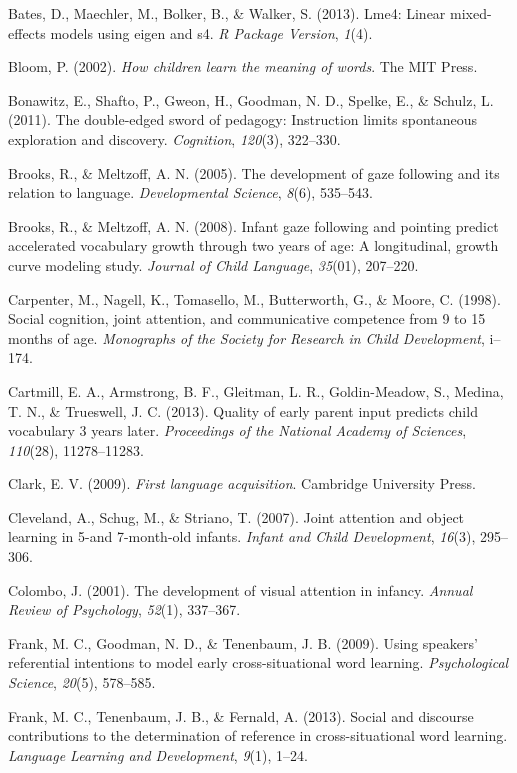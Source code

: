 \documentclass[a4paper,man,natbib]{apa6}
\begin{document}
Bates, D., Maechler, M., Bolker, B., \& Walker, S. (2013). Lme4: Linear
mixed-effects models using eigen and s4. \emph{R Package Version},
\emph{1}(4).

Bloom, P. (2002). \emph{How children learn the meaning of words}. The
MIT Press.

Bonawitz, E., Shafto, P., Gweon, H., Goodman, N. D., Spelke, E., \&
Schulz, L. (2011). The double-edged sword of pedagogy: Instruction
limits spontaneous exploration and discovery. \emph{Cognition},
\emph{120}(3), 322--330.

Brooks, R., \& Meltzoff, A. N. (2005). The development of gaze following
and its relation to language. \emph{Developmental Science}, \emph{8}(6),
535--543.

Brooks, R., \& Meltzoff, A. N. (2008). Infant gaze following and
pointing predict accelerated vocabulary growth through two years of age:
A longitudinal, growth curve modeling study. \emph{Journal of Child
Language}, \emph{35}(01), 207--220.

Carpenter, M., Nagell, K., Tomasello, M., Butterworth, G., \& Moore, C.
(1998). Social cognition, joint attention, and communicative competence
from 9 to 15 months of age. \emph{Monographs of the Society for Research
in Child Development}, i--174.

Cartmill, E. A., Armstrong, B. F., Gleitman, L. R., Goldin-Meadow, S.,
Medina, T. N., \& Trueswell, J. C. (2013). Quality of early parent input
predicts child vocabulary 3 years later. \emph{Proceedings of the
National Academy of Sciences}, \emph{110}(28), 11278--11283.

Clark, E. V. (2009). \emph{First language acquisition}. Cambridge
University Press.

Cleveland, A., Schug, M., \& Striano, T. (2007). Joint attention and
object learning in 5-and 7-month-old infants. \emph{Infant and Child
Development}, \emph{16}(3), 295--306.

Colombo, J. (2001). The development of visual attention in infancy.
\emph{Annual Review of Psychology}, \emph{52}(1), 337--367.

Frank, M. C., Goodman, N. D., \& Tenenbaum, J. B. (2009). Using
speakers' referential intentions to model early cross-situational word
learning. \emph{Psychological Science}, \emph{20}(5), 578--585.

Frank, M. C., Tenenbaum, J. B., \& Fernald, A. (2013). Social and
discourse contributions to the determination of reference in
cross-situational word learning. \emph{Language Learning and
Development}, \emph{9}(1), 1--24.
\end{document}

